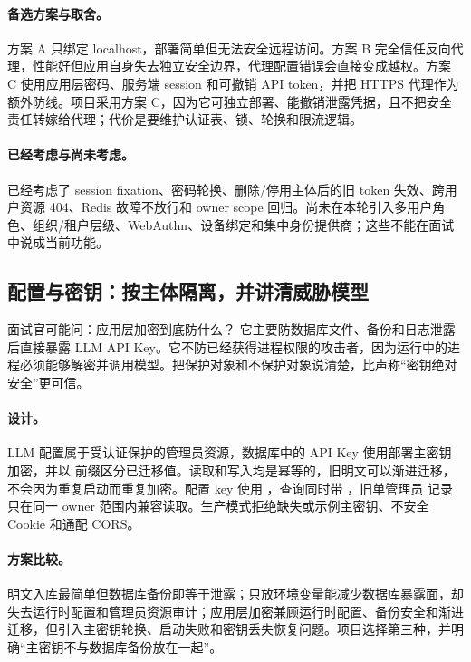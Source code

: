 \paragraph{备选方案与取舍。}
方案 A 只绑定 localhost，部署简单但无法安全远程访问。方案 B 完全信任反向代理，性能好但应用自身失去独立安全边界，代理配置错误会直接变成越权。方案 C 使用应用层密码、服务端 session 和可撤销 API token，并把 HTTPS 代理作为额外防线。项目采用方案 C，因为它可独立部署、能撤销泄露凭据，且不把安全责任转嫁给代理；代价是要维护认证表、锁、轮换和限流逻辑。

\paragraph{已经考虑与尚未考虑。}
已经考虑了 session fixation、密码轮换、删除/停用主体后的旧 token 失效、跨用户资源 404、Redis 故障不放行和 owner scope 回归。尚未在本轮引入多用户角色、组织/租户层级、WebAuthn、设备绑定和集中身份提供商；这些不能在面试中说成当前功能。

\subsection{配置与密钥：按主体隔离，并讲清威胁模型}

\begin{qaBox}{面试官可能问：应用层加密到底防什么？}
它主要防数据库文件、备份和日志泄露后直接暴露 LLM API Key。它不防已经获得进程权限的攻击者，因为运行中的进程必须能够解密并调用模型。把保护对象和不保护对象说清楚，比声称“密钥绝对安全”更可信。
\end{qaBox}

\paragraph{设计。}
LLM 配置属于受认证保护的管理员资源，数据库中的 API Key 使用部署主密钥加密，并以  前缀区分已迁移值。读取和写入均是幂等的，旧明文可以渐进迁移，不会因为重复启动而重复加密。配置 key 使用 ，查询同时带 ，旧单管理员  记录只在同一 owner 范围内兼容读取。生产模式拒绝缺失或示例主密钥、不安全 Cookie 和通配 CORS。

\paragraph{方案比较。}
明文入库最简单但数据库备份即等于泄露；只放环境变量能减少数据库暴露面，却失去运行时配置和管理员资源审计；应用层加密兼顾运行时配置、备份安全和渐进迁移，但引入主密钥轮换、启动失败和密钥丢失恢复问题。项目选择第三种，并明确“主密钥不与数据库备份放在一起”。


